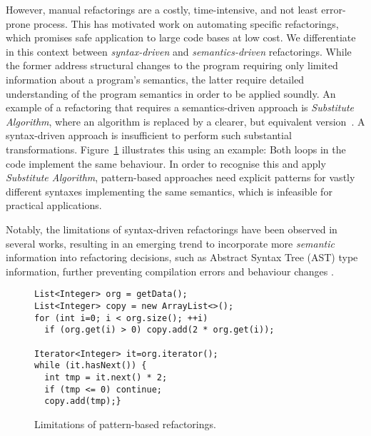 \documentclass[runningheads,a4paper]{llncs}
\begin{document}
However, manual refactorings are a costly, time-intensive, and not least
error-prone process.  This has motivated work on automating specific
refactorings, which promises safe application to large code bases at low
cost.  We differentiate in this context between {\em syntax-driven} and {\em
semantics-driven} refactorings.  While the former address structural changes
to the program requiring only limited information about a program's
semantics, the latter require detailed understanding of the program
semantics in order to be applied soundly.  An example of a refactoring that
requires a semantics-driven approach is {\em Substitute Algorithm}, where an
algorithm is replaced by a clearer, but equivalent
version~\cite{Fowler1999}.
%
%
A syntax-driven approach is insufficient to perform such substantial
transformations.  Figure~\ref{ex:syntax-limits} illustrates this using an
example: Both loops in the code implement the same behaviour.  In order to
recognise this and apply {\em Substitute Algorithm}, pattern-based
approaches need explicit patterns for vastly different syntaxes implementing
the same semantics, which is infeasible for practical applications.


Notably, the limitations of syntax-driven refactorings have been observed
in several works, resulting in an emerging trend to incorporate more {\em semantic}
information into refactoring decisions, such as Abstract Syntax Tree (AST) 
type information,
further preventing compilation errors and behaviour changes
\cite{Steimann2011,Steimann2012Pilgrim,Steimann2011KollePilgrim}.

\begin{figure}
  \begin{lstlisting}[mathescape=true,showstringspaces=false]
List<Integer> org = getData();
List<Integer> copy = new ArrayList<>();
for (int i=0; i < org.size(); ++i)
  if (org.get(i) > 0) copy.add(2 * org.get(i));

Iterator<Integer> it=org.iterator();
while (it.hasNext()) {
  int tmp = it.next() * 2;
  if (tmp <= 0) continue;
  copy.add(tmp);}
\end{lstlisting}
\caption{Limitations of pattern-based refactorings.}
\label{ex:syntax-limits}
\end{figure}
\end{document}
